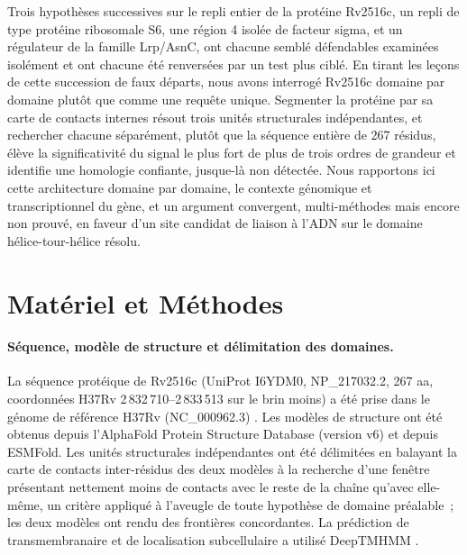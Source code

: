 \documentclass[11pt,a4paper]{article}
\begin{document}
Trois hypothèses successives sur le repli entier de la protéine Rv2516c, un repli de type protéine
ribosomale S6, une région 4 isolée de facteur sigma, et un régulateur de la famille Lrp/AsnC, ont
chacune semblé défendables examinées isolément et ont chacune été renversées par un test plus
ciblé. En tirant les leçons de cette succession de faux départs, nous avons interrogé Rv2516c
domaine par domaine plutôt que comme une requête unique. Segmenter la protéine par sa carte de
contacts internes résout trois unités structurales indépendantes, et rechercher chacune séparément,
plutôt que la séquence entière de 267 résidus, élève la significativité du signal le plus fort de
plus de trois ordres de grandeur et identifie une homologie confiante, jusque-là non détectée. Nous
rapportons ici cette architecture domaine par domaine, le contexte génomique et transcriptionnel du
gène, et un argument convergent, multi-méthodes mais encore non prouvé, en faveur d'un site
candidat de liaison à l'ADN sur le domaine hélice-tour-hélice résolu.

\section{Matériel et Méthodes}

\paragraph{Séquence, modèle de structure et délimitation des domaines.} La séquence protéique de
Rv2516c (UniProt I6YDM0, NP\_217032.2, 267 aa, coordonnées H37Rv 2\,832\,710--2\,833\,513 sur le
brin moins) a été prise dans le génome de référence H37Rv (NC\_000962.3) \citep{cole1998genome}.
Les modèles de structure ont été obtenus depuis l'AlphaFold Protein Structure Database (version v6)
\citep{jumper2021alphafold,varadi2022afdb} et depuis ESMFold. Les unités structurales indépendantes
ont été délimitées en balayant la carte de contacts inter-résidus des deux modèles à la recherche
d'une fenêtre présentant nettement moins de contacts avec le reste de la chaîne qu'avec elle-même,
un critère appliqué à l'aveugle de toute hypothèse de domaine préalable~; les deux modèles ont
rendu des frontières concordantes. La prédiction de transmembranaire et de localisation
subcellulaire a utilisé DeepTMHMM \citep{hallgren2022deeptmhmm}.
\end{document}
